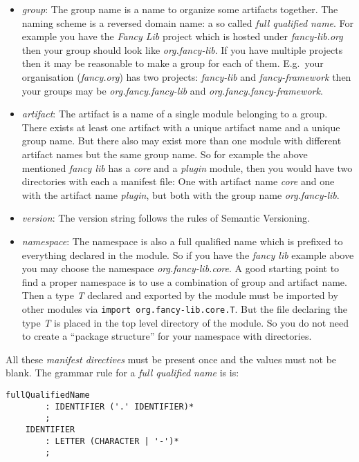 \documentclass[11pt,a4paper]{report}
\begin{document}
\begin{itemize}
    \item \textit{group}: The group name is a name to organize some artifacts together. The naming scheme is a reversed domain name: a so called \textit{full qualified name}. For example you have the \textit{Fancy Lib} project which is hosted under \textit{fancy-lib.org} then your group should look like \textit{org.fancy-lib}. If you have multiple projects then it may be reasonable to make a group for each of them. E.g.\ your organisation (\textit{fancy.org}) has two projects: \textit{fancy-lib} and \textit{fancy-framework} then your groups may be \textit{org.fancy.fancy-lib} and \textit{org.fancy.fancy-framework}.
    \item \textit{artifact}: The artifact is a name of a single module belonging to a group. There exists at least one artifact with a unique artifact name and a unique group name. But there also may exist more than one module with different artifact names but the same group name. So for example the above mentioned \textit{fancy lib} has a \textit{core} and a \textit{plugin} module, then you would have two directories with each a manifest file: One with artifact name \textit{core} and one with the artifact name \textit{plugin}, but both with the group name \textit{org.fancy-lib}.
    \item \textit{version}: The version string follows the rules of Semantic Versioning\cite{semver}.
    \item \textit{namespace}: The namespace is also a full qualified name which is prefixed to everything declared in the module. So if you have the \textit{fancy lib} example above you may choose the namespace \textit{org.fancy-lib.core}. A good starting point to find a proper namespace is to use a combination of group and artifact name. Then a type \textit{T} declared and exported by the module must be imported by other modules via \texttt{import org.fancy-lib.core.T}. But the file declaring the type \textit{T} is placed in the top level directory of the module. So you do not need to create a ``package structure'' for your namespace with directories. 
\end{itemize}

All these \textit{manifest directives} must be present once and the values must not be blank. The grammar rule for a \textit{full qualified name} is is: 

\begin{lstlisting}[title=Grammar for full qualified name]
    fullQualifiedName 
        : IDENTIFIER ('.' IDENTIFIER)*
        ;
    IDENTIFIER 
        : LETTER (CHARACTER | '-')*
        ;
\end{lstlisting}
\end{document}
